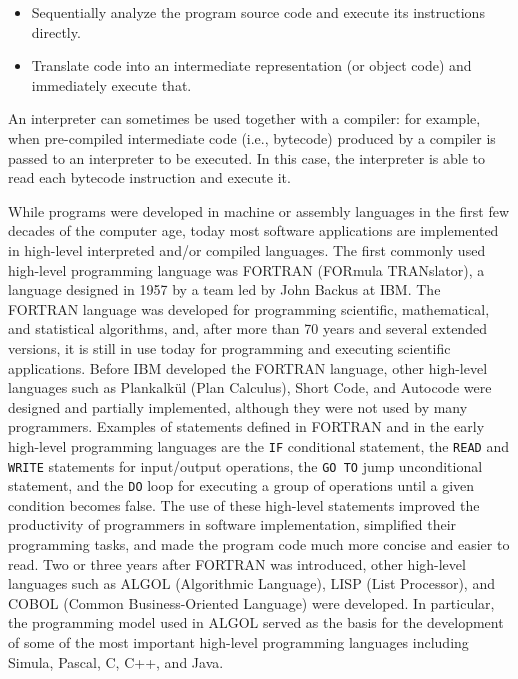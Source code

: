 \begin{itemize}
\item Sequentially analyze the program source code and execute its instructions directly.

\item Translate code into an intermediate representation (or object code) and immediately execute that.
\end{itemize}

\noindent An interpreter can sometimes be used together with a compiler: for example, when pre-compiled intermediate code (i.e., bytecode) produced by a compiler is passed to an interpreter to be executed. In this case, the interpreter is able to read each bytecode instruction and execute it.

While programs were developed in machine or assembly languages in the first few decades of the computer age, today most software applications are implemented in high-level interpreted and/or compiled languages. The first commonly used high-level programming language was FORTRAN (FORmula TRANslator), a language designed in 1957 by a team led by John Backus at IBM. The FORTRAN language was developed for programming scientific, mathematical, and statistical algorithms, and, after more than 70 years and several extended versions, it is still in use today for programming and executing scientific applications. Before IBM developed the FORTRAN language, other high-level languages such as Plankalk\"{u}l (Plan Calculus), Short Code, and Autocode were designed and partially implemented, although they were not used by many programmers. Examples of  statements defined in FORTRAN and in the early high-level programming languages are the \texttt{IF} conditional statement, the \texttt{READ} and \texttt{WRITE} statements for input/{\allowbreak}output operations, the \texttt{GO~TO} jump unconditional statement, and the \texttt{DO} loop for executing a group of operations until a given condition becomes false. The use of these high-level statements improved the productivity of programmers in software implementation, simplified their programming tasks, and made the program code much more concise and easier to read. Two or three years after FORTRAN was introduced, other high-level languages such as ALGOL (Algorithmic Language), LISP (List Processor), and COBOL (Common Business-Oriented Language) were developed. In particular, the programming model used in ALGOL served as the basis for the development of some of the most important high-level programming languages including Simula, Pascal, C, C++, and Java.

